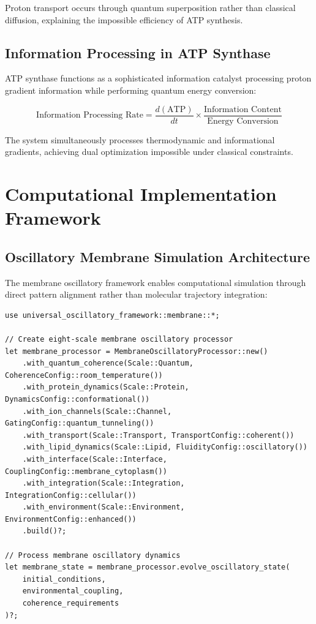 \documentclass[12pt,a4paper]{article}
\begin{document}
Proton transport occurs through quantum superposition rather than classical diffusion, explaining the impossible efficiency of ATP synthesis.

\subsection{Information Processing in ATP Synthase}

ATP synthase functions as a sophisticated information catalyst processing proton gradient information while performing quantum energy conversion:

\begin{equation}
\text{Information Processing Rate} = \frac{d(\text{ATP})}{dt} \times \frac{\text{Information Content}}{\text{Energy Conversion}}
\end{equation}

The system simultaneously processes thermodynamic and informational gradients, achieving dual optimization impossible under classical constraints.

\section{Computational Implementation Framework}

\subsection{Oscillatory Membrane Simulation Architecture}

The membrane oscillatory framework enables computational simulation through direct pattern alignment rather than molecular trajectory integration:

\begin{verbatim}
use universal_oscillatory_framework::membrane::*;

// Create eight-scale membrane oscillatory processor
let membrane_processor = MembraneOscillatoryProcessor::new()
    .with_quantum_coherence(Scale::Quantum, CoherenceConfig::room_temperature())
    .with_protein_dynamics(Scale::Protein, DynamicsConfig::conformational())
    .with_ion_channels(Scale::Channel, GatingConfig::quantum_tunneling())
    .with_transport(Scale::Transport, TransportConfig::coherent())
    .with_lipid_dynamics(Scale::Lipid, FluidityConfig::oscillatory())
    .with_interface(Scale::Interface, CouplingConfig::membrane_cytoplasm())
    .with_integration(Scale::Integration, IntegrationConfig::cellular())
    .with_environment(Scale::Environment, EnvironmentConfig::enhanced())
    .build()?;

// Process membrane oscillatory dynamics
let membrane_state = membrane_processor.evolve_oscillatory_state(
    initial_conditions,
    environmental_coupling,
    coherence_requirements
)?;
\end{verbatim}
\end{document}
